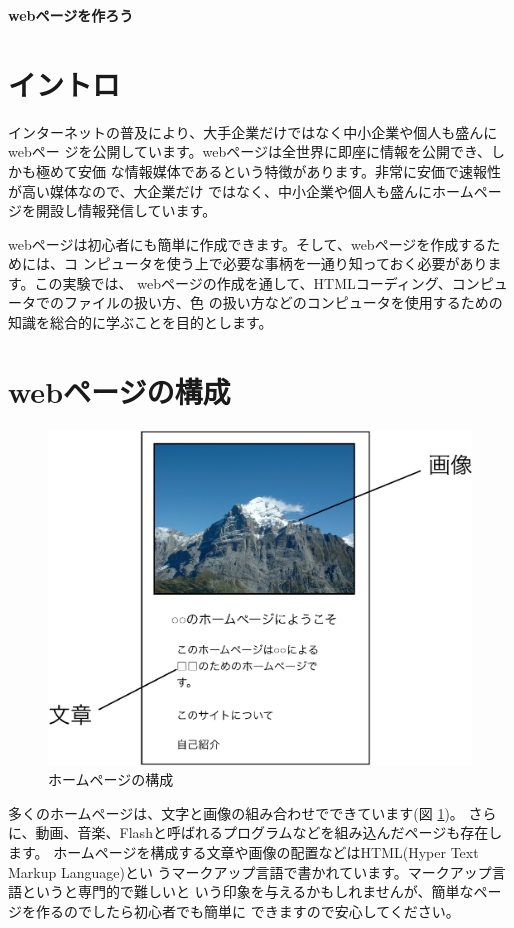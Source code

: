 \documentclass[12pt, a4j]{jsarticle}
\title{}
\author{}
\date{}
\newcommand{\figref}[1]{図 \ref{#1}}
\begin{document}
{\LARGE \bf \sf webページを作ろう}
\section{イントロ}

インターネットの普及により、大手企業だけではなく中小企業や個人も盛んにwebペー
ジを公開しています。webページは全世界に即座に情報を公開でき、しかも極めて安価
な情報媒体であるという特徴があります。非常に安価で速報性が高い媒体なので、大企業だけ
ではなく、中小企業や個人も盛んにホームページを開設し情報発信しています。

webページは初心者にも簡単に作成できます。そして、webページを作成するためには、コ
ンピュータを使う上で必要な事柄を一通り知っておく必要があります。この実験では、
webページの作成を通して、HTMLコーディング、コンピュータでのファイルの扱い方、色
の扱い方などのコンピュータを使用するための知識を総合的に学ぶことを目的とします。

\section{webページの構成}

\begin{figure}
\vspace{-20pt}
\begin{center}
\includegraphics[width=1\linewidth]{webpage-summary.eps}
\caption{ホームページの構成}
\label{fig:summary}
\end{center}
\end{figure}
多くのホームページは、文字と画像の組み合わせでできています(\figref{fig:summary})。
さらに、動画、音楽、Flashと呼ばれるプログラムなどを組み込んだページも存在します。
ホームページを構成する文章や画像の配置などはHTML(Hyper Text Markup Language)とい
うマークアップ言語で書かれています。マークアップ言語というと専門的で難しいと
いう印象を与えるかもしれませんが、簡単なページを作るのでしたら初心者でも簡単に
できますので安心してください。
\end{document}
